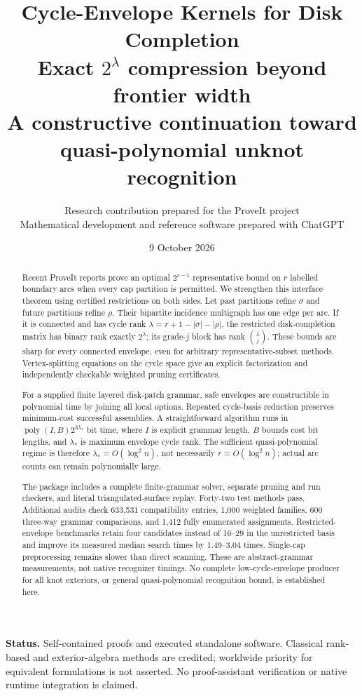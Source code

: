 \documentclass[11pt,a4paper]{article}
\title{\textbf{Cycle-Envelope Kernels for Disk Completion}\\[5pt]
\Large Exact $2^\lambda$ compression beyond frontier width\\[6pt]
\large A constructive continuation toward quasi-polynomial unknot recognition}
\author{Research contribution prepared for the ProveIt project\\
\small Mathematical development and reference software prepared with ChatGPT}
\date{9 October 2026}
\theoremstyle{definition}
\theoremstyle{remark}
\newcommand{\poly}{\operatorname{poly}}
\begin{document}
\maketitle
\begin{abstract}
Recent ProveIt reports prove an optimal $2^{r-1}$ representative bound on $r$ labelled
boundary arcs when every cap partition is permitted. We strengthen this interface theorem
using certified restrictions on both sides. Let past partitions refine $\sigma$ and future
partitions refine $\rho$. Their bipartite incidence multigraph has one edge per arc. If it
is connected and has cycle rank $\lambda=r+1-|\sigma|-|\rho|$, the restricted
disk-completion matrix has binary rank exactly $2^\lambda$; its grade-$j$ block has rank
$\binom\lambda j$. These bounds are sharp for every connected envelope, even for arbitrary
representative-subset methods. Vertex-splitting equations on the cycle space give an
explicit factorization and independently checkable weighted pruning certificates.

For a supplied finite layered disk-patch grammar, safe envelopes are constructible in
polynomial time by joining all local options. Repeated cycle-basis reduction preserves
minimum-cost successful assemblies. A straightforward algorithm runs in
$\poly(I,B)2^{3\lambda_*}$ bit time, where $I$ is explicit grammar length, $B$ bounds cost
bit lengths, and $\lambda_*$ is maximum envelope cycle rank. The sufficient
quasi-polynomial regime is therefore $\lambda_*=O(\log^2 n)$, not necessarily
$r=O(\log^2 n)$; actual arc counts can remain polynomially large.

The package includes a complete finite-grammar solver, separate pruning and run checkers,
and literal triangulated-surface replay. Forty-two test methods pass. Additional audits
check 633,531 compatibility entries, 1,000 weighted families, 600 three-way grammar
comparisons, and 1,412 fully enumerated assignments. Restricted-envelope benchmarks retain
four candidates instead of 16--29 in the unrestricted basis and improve its measured median
search times by 1.49--3.04 times. Single-cap preprocessing remains slower than direct
scanning. These are abstract-grammar measurements, not native recognizer timings.
No complete low-cycle-envelope producer for all knot exteriors, or general
quasi-polynomial recognition bound, is established here.
\end{abstract}
\noindent\textbf{Status.} Self-contained proofs and executed standalone software. Classical
rank-based and exterior-algebra methods are credited; worldwide priority for equivalent
formulations is not asserted. No proof-assistant verification or native runtime integration
is claimed.
\clearpage
\begingroup\small\setlength{\parskip}{0pt}\tableofcontents\endgroup
\clearpage
\end{document}
